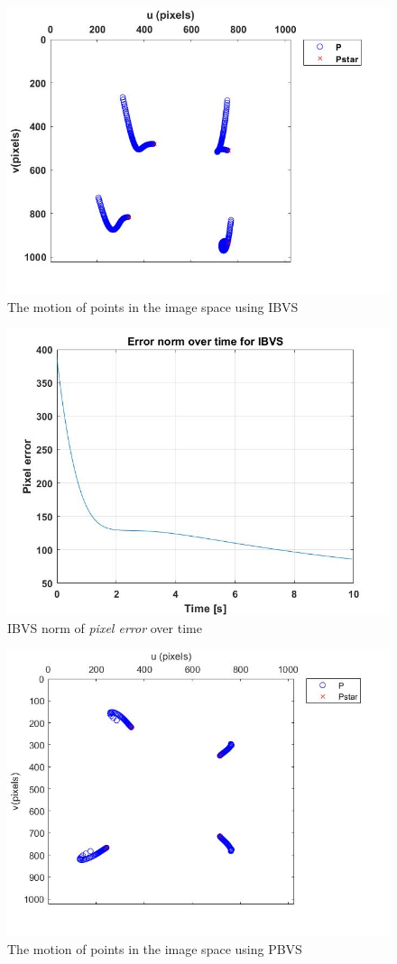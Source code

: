 \documentclass{UoNMCHA}
\numberwithin{equation}{section}
\begin{document}
\begin{figure}[H]
	\begin{center}
		\includegraphics[width=.7\linewidth]{Figures/IBVSimagespace}
		\caption{The motion of points in the image space using IBVS}
	\end{center}
\end{figure}

\begin{figure}[H]
	\begin{center}
		\includegraphics[width=.7\linewidth]{Figures/IBVSerrorplot}
		\caption{IBVS norm of \textit{pixel error} over time}
	\end{center}
\end{figure}

\begin{figure}[H]
	\begin{center}
		\includegraphics[width=.7\linewidth]{Figures/PBVSimagespace}
		\caption{The motion of points in the image space using PBVS}
	\end{center}
\end{figure}
\end{document}
